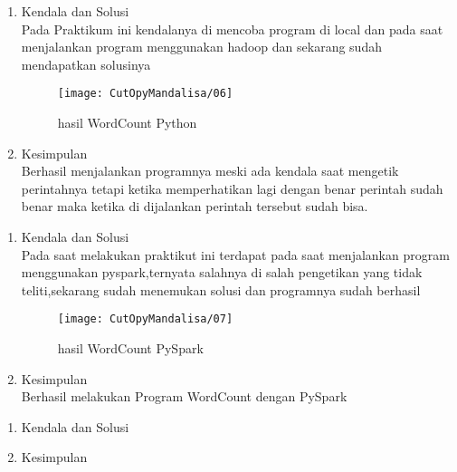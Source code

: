\begin{enumerate}
\item Kendala dan Solusi\\
Pada Praktikum ini kendalanya di mencoba program di local dan pada saat menjalankan program menggunakan hadoop dan sekarang sudah mendapatkan solusinya

\begin{figure}[!ht]
\texttt{[image: CutOpyMandalisa/06]}
\caption{hasil WordCount Python}
\label{gam:perkuliahan-16-12}
\end{figure}

\item Kesimpulan\\
Berhasil menjalankan programnya meski ada kendala saat mengetik perintahnya tetapi ketika memperhatikan lagi dengan benar perintah sudah benar maka ketika di dijalankan perintah tersebut sudah bisa.
\end{enumerate}

\begin{enumerate}
\item Kendala dan Solusi\\
Pada saat melakukan praktikut ini terdapat pada saat menjalankan program menggunakan pyspark,ternyata salahnya di salah pengetikan yang tidak teliti,sekarang sudah menemukan solusi dan programnya sudah berhasil

\begin{figure}[!ht]
\texttt{[image: CutOpyMandalisa/07]}
\caption{hasil WordCount PySpark }
\label{gam:perkuliahan-22-12}
\end{figure}

\item Kesimpulan\\
Berhasil melakukan Program WordCount dengan PySpark
\end{enumerate}

\begin{enumerate}
\item Kendala dan Solusi

\item Kesimpulan
\end{enumerate}